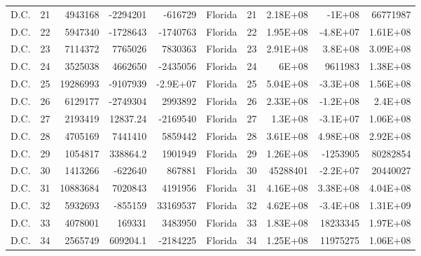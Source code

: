 \begin{landscape}
\begin{singlespace}
\begin{longtable}{lrrrr|lrrrr}
		D.C. &  21 & 4943168 & -2294201 & -616729 & Florida &  21 & 2.18E+08 & -1E+08 & 66771987 \\
		D.C. &  22 & 5947340 & -1728643 & -1740763 & Florida &  22 & 1.95E+08 & -4.8E+07 & 1.61E+08 \\
		D.C. &  23 & 7114372 & 7765026 & 7830363 & Florida &  23 & 2.91E+08 & 3.8E+08 & 3.09E+08 \\
		D.C. &  24 & 3525038 & 4662650 & -2435056 & Florida &  24 & 6E+08 & 9611983 & 1.38E+08 \\
		D.C. &  25 & 19286993 & -9107939 & -2.9E+07 & Florida &  25 & 5.04E+08 & -3.3E+08 & 1.56E+08 \\
		D.C. &  26 & 6129177 & -2749304 & 2993892 & Florida &  26 & 2.33E+08 & -1.2E+08 & 2.4E+08 \\
		D.C. &  27 & 2193419 & 12837.24 & -2169540 & Florida &  27 & 1.3E+08 & -3.1E+07 & 1.06E+08 \\
		D.C. &  28 & 4705169 & 7441410 & 5859442 & Florida &  28 & 3.61E+08 & 4.98E+08 & 2.92E+08 \\
		D.C. &  29 & 1054817 & 338864.2 & 1901949 & Florida &  29 & 1.26E+08 & -1253905 & 80282854 \\
		D.C. &  30 & 1413266 & -622640 & 867881 & Florida &  30 & 45288401 & -2.2E+07 & 20440027 \\
		D.C. &  31 & 10883684 & 7020843 & 4191956 & Florida &  31 & 4.16E+08 & 3.38E+08 & 4.04E+08 \\
		D.C. &  32 & 5932693 & -855159 & 33169537 & Florida &  32 & 4.62E+08 & -3.4E+08 & 1.31E+09 \\
		D.C. &  33 & 4078001 & 169331 & 3483950 & Florida &  33 & 1.83E+08 & 18233345 & 1.97E+08 \\
		D.C. &  34 & 2565749 & 609204.1 & -2184225 & Florida &  34 & 1.25E+08 & 11975275 & 1.06E+08\\


\end{longtable}
\end{singlespace}
\end{landscape}
